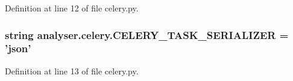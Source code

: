 Definition at line 12 of file celery.\-py.

\hypertarget{namespaceanalyser_1_1celery_ab91ed0525a64ceb5a617d27e73d0c3ca}{
\subsubsection[{C\-E\-L\-E\-R\-Y\-\_\-\-T\-A\-S\-K\-\_\-\-S\-E\-R\-I\-A\-L\-I\-Z\-E\-R}]{\setlength{\rightskip}{0pt plus 5cm}string analyser.\-celery.\-C\-E\-L\-E\-R\-Y\-\_\-\-T\-A\-S\-K\-\_\-\-S\-E\-R\-I\-A\-L\-I\-Z\-E\-R = 'json'}}\label{namespaceanalyser_1_1celery_ab91ed0525a64ceb5a617d27e73d0c3ca}


Definition at line 13 of file celery.\-py.

